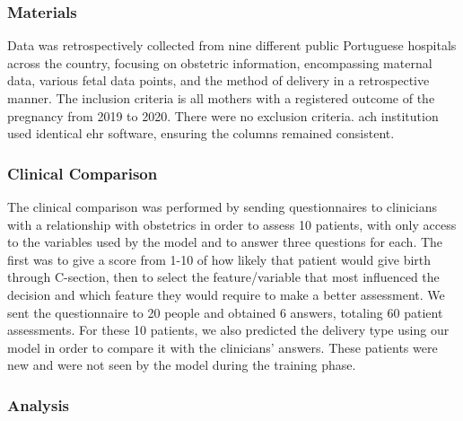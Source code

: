 
\subsubsection{Materials}
Data was retrospectively collected from nine different public Portuguese hospitals across the country, focusing on obstetric information, encompassing maternal data, various fetal data points, and the method of delivery in a retrospective manner. The inclusion criteria is all mothers with a registered outcome of the pregnancy from 2019 to 2020. There were no exclusion criteria. ach institution used identical \ac{ehr} software, ensuring the columns remained consistent. 

\subsubsection{Clinical Comparison}
The clinical comparison was performed by sending questionnaires to clinicians with a relationship with obstetrics in order to assess 10 patients, with only access to the variables used by the model and to answer three questions for each. The first was to give a score from 1-10 of how likely that patient would give birth through C-section, then to select the feature/variable that most influenced the decision and which feature they would require to make a better assessment. We sent the questionnaire to 20 people and obtained 6 answers, totaling 60 patient assessments. For these 10 patients, we also predicted the delivery type using our model in order to compare it with the clinicians' answers. These patients were new and were not seen by the model during the training phase.

\subsubsection{Analysis}

